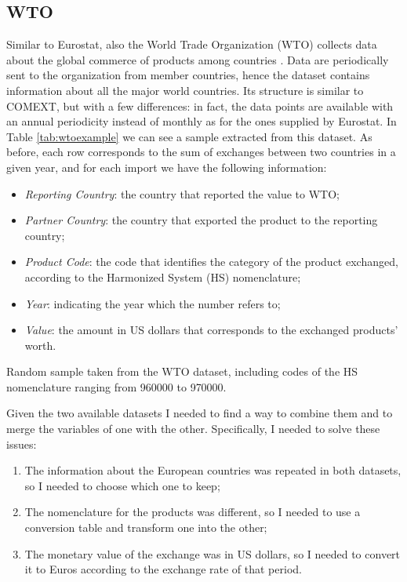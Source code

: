 \subsection{WTO}
Similar to Eurostat, also the World Trade Organization (WTO) collects data about the global commerce of products among countries \cite{wto2022stats}. Data are periodically sent to the organization from member countries, hence the dataset contains information about all the major world countries.
Its structure is similar to COMEXT, but with a few differences: in fact, the data points are available with an annual periodicity instead of monthly as for the ones supplied by Eurostat. In Table \ref{tab:wtoexample} we can see a sample extracted from this dataset. As before, each row corresponds to the sum of exchanges between two countries in a given year, and for each import we have the following information:
\begin{itemize}
    \item \textit{Reporting Country}: the country that reported the value to WTO;
    \item \textit{Partner Country}: the country that exported the product to the reporting country;
    \item \textit{Product Code}: the code that identifies the category of the product exchanged, according to the Harmonized System (HS) nomenclature;
    \item \textit{Year}: indicating the year which the number refers to;
    \item \textit{Value}: the amount in US dollars that corresponds to the exchanged products' worth.
\end{itemize}

\begin{table}
    \centering
    
    \caption[Random sample taken from the WTO dataset]{Random sample taken from the WTO dataset, including codes of the HS nomenclature ranging from 960000 to 970000.}
    \label{tab:wtoexample}
\end{table}

Given the two available datasets I needed to find a way to combine them and to merge the variables of one with the other. Specifically, I needed to solve these issues:
\begin{enumerate}
    \item The information about the European countries was repeated in both datasets, so I needed to choose which one to keep;
    \item The nomenclature for the products was different, so I needed to use a conversion table and transform one into the other;
    \item The monetary value of the exchange was in US dollars, so I needed to convert it to Euros according to the exchange rate of that period.
\end{enumerate}

